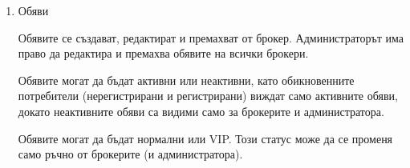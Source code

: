 \documentclass[]{article}
\begin{document}
\begin{enumerate}[I.]
{\begin{enumerate}[1.]
{\begin{itemize}
{\begin{itemize}
							\item вижда контактната информация за собствениците на имотите в своите обяви
						\end{itemize}
					}
					\item {администратор (вграден в системата сервизен акаунт, единствен):
						\begin{itemize}
							\item има права да променя личните си данни
							\item има право да разглежда личните данни на потребителите (username, email, име, телефон, снимка)
							\item няма право да променя личните данни на потребителите (username, парола, email, име, телефон, снимка)
							\item има право да одобрява заявки на регистрирани потребители за промяна на статуса им към 'брокер'
							\item има право да премахва статуса 'брокер' от акаунти
							\item има право да премахва акаунти от системата, без сервизните такива
							\item има право да премахва и реадктира обяви
							\item получава копие от съобщенията, изпратени през контакт формата
						\end{itemize}
					}
					\item одитор (вграден в системата сервизен акаунт, единствен) -- има права само да чете одит лога
				\end{itemize}
			}
			\item {Обяви
			
				Обявите се създават, редактират и премахват от брокер. Администраторът има право да редактира и премахва обявите на всички брокери.

				Обявите могат да бъдат активни или неактивни, като обикновенните потребители (нерегистрирани и регистрирани) виждат само активните обяви, докато неактивните обяви са видими само за брокерите и администратора.

				Обявите могат да бъдат нормални или VIP. Този статус може да се променя само ръчно от брокерите (и администратора).
				
}
\end{enumerate}}
\end{enumerate}
\end{document}
